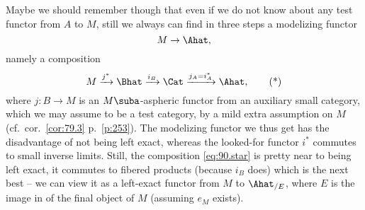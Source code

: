 Maybe we should remember though that even if we do not know about any
test functor from $A$ to $M$, still we always can find in three steps
a modelizing functor
\[M\to\Ahat,\]
namely a composition
\begin{equation}
  \label{eq:90.star}
  M \xrightarrow{j^*} \Bhat \xrightarrow{i_B}
  \Cat\xrightarrow{j_A=i_A^*} \Ahat,\tag{*}
\end{equation}
where $j:B\to M$ is an $M\suba$-aspheric functor from an auxiliary
small category, which we may assume to be a test category, by a mild
extra assumption on $M$ (cf.\ cor.\ \ref{cor:79.3} p.\
\ref{p:253}). The modelizing functor we thus get has the disadvantage
of not being left exact, whereas the looked-for functor $i^*$ commutes
to small inverse limits. Still, the composition \eqref{eq:90.star} is
pretty near to being left exact, it commutes to fibered products
(because $i_B$ does) which is the next best -- we can view it as a
left-exact functor from $M$ to $\Ahat_{/E}$, where $E$ is the image in
\Ahat{} of the final object of $M$ (assuming $e_M$ exists).

